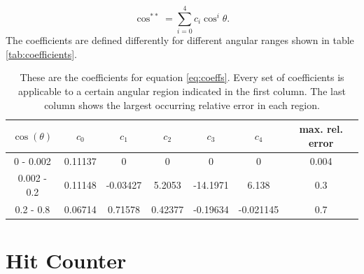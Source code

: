   \begin{equation}
  	\cos^{**} = \sum_{i=0}^{4}{c_i \cos^i{\theta}}.
  	\label{eq:coeffs}
  \end{equation}
  The coefficients are defined differently for different angular ranges shown in table \ref{tab:coefficients}.
  \begin{table}
  \centering
  	\begin{tabular}{|c|c|c|c|c|c|c|}
  	\hline
  		$\cos{\left(\theta\right)}$ & $c_0$ & $c_1$ & $c_2$ & $c_3$ & $c_4$ & max. rel. error\\
  		\hline
  		0 - 0.002 & 0.11137 & 0 & 0 & 0 & 0 & 0.004\\
	
  		0.002 - 0.2 & 0.11148 & -0.03427 & 5.2053 & -14.1971 & 6.138 & 0.3\\
  		0.2 - 0.8 & 0.06714 & 0.71578 & 0.42377 & -0.19634 & -0.021145 & 0.7\\
  		\hline
  	\end{tabular}
	\caption[Angular distribution coefficients]{These are the coefficients for equation \ref{eq:coeffs}. Every set of coefficients is applicable to a certain angular region indicated in the first column. The last column shows the largest occurring relative error in each region. }
  \end{table}

  
  \section{Hit Counter}
  \label{ch:Simulation software:sec:Hit counter}
  
